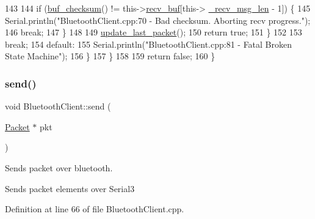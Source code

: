 \begin{DoxyCode}
143 
144                     \textcolor{keywordflow}{if} (\hyperlink{class_bluetooth_client_a916ad4b917618bcc23dab0d258fe77d9}{buf\_checksum}() != this->\hyperlink{class_bluetooth_client_a83675b45ddf8021663ecd6200a22b1cb}{recv\_buf}[this->
      \hyperlink{class_bluetooth_client_a30e47aa21808bd60b99cf5778e67c059}{\_recv\_msg\_len} - 1]) \{
145                         Serial.println(\textcolor{stringliteral}{"BluetoothClient.cpp:70 - Bad checksum. Aborting recv progress."});
146                         \textcolor{keywordflow}{break};
147                     \}
148 
149                     \hyperlink{class_bluetooth_client_a52ed2098b5525a6aef38af5af5c74a91}{update\_last\_packet}();
150                     \textcolor{keywordflow}{return} \textcolor{keyword}{true};
151                 \}
152 
153                 \textcolor{keywordflow}{break};
154             \textcolor{keywordflow}{default}:
155                 Serial.println(\textcolor{stringliteral}{"BluetoothClient.cpp:81 - Fatal Broken State Machine"});
156         \}
157     \}
158 
159     \textcolor{keywordflow}{return} \textcolor{keyword}{false};
160 \}
\end{DoxyCode}
\mbox{\label{class_bluetooth_client_a0f0d9b99f80c2eab9d9d33d8aca91bf6}} 
\subsubsection{\texorpdfstring{send()}{send()}}
{\footnotesize\ttfamily void Bluetooth\+Client\+::send (\begin{DoxyParamCaption}\item[{\hyperlink{class_packet}{Packet} $\ast$}]{pkt }\end{DoxyParamCaption})}



Sends packet over bluetooth. 

Sends packet elements over Serial3 

Definition at line 66 of file Bluetooth\+Client.\+cpp.


